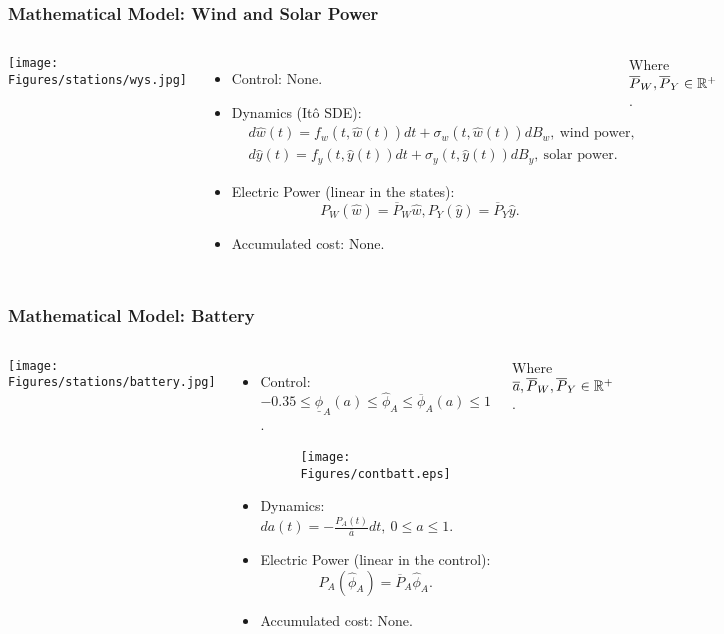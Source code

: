 \begin{frame}
\frametitle{Mathematical Model: Wind and Solar Power}

\begin{columns}[c]

\texttt{[image: Figures/stations/wys.jpg]}\\

\begin{itemize}
\item Control: None.
\item Dynamics (It\^o SDE):
\begin{equation*}
\begin{aligned}
&d\hat{w}(t)=f_w(t,\hat{w}(t))dt+\sigma_w(t,\hat{w}(t))dB_w,\ \text{wind power},\\
&d\hat{y}(t)=f_y(t,\hat{y}(t))dt+\sigma_y(t,\hat{y}(t))dB_y,\ \text{solar power}.
\end{aligned}
\end{equation*}
\item Electric Power (linear in the states):
\begin{equation*}
P_W(\hat{w})=\overline{P}_W\hat{w},P_Y(\hat{y})=\overline{P}_Y\hat{y}.
\end{equation*}
\item Accumulated cost: None.
\end{itemize}
Where $\overline{P}_W,\overline{P}_Y\in\mathbb{R}^+$.
\end{columns}
\end{frame}


\begin{frame}
\frametitle{Mathematical Model: Battery}

\begin{columns}[c]

\texttt{[image: Figures/stations/battery.jpg]}\\

\begin{itemize}
\item Control: $-0.35\leq\underline{\phi}_A(a)\leq\hat{\phi}_A\leq\overline{\phi}_A(a)\leq1$.
\begin{figure}[ht!]
\centering
\texttt{[image: Figures/contbatt.eps]}
\end{figure}
\item Dynamics: $da(t)=-\frac{P_A(t)}{\overline{a}}dt,\ 0\leq a\leq1$.
\item Electric Power (linear in the control):
\begin{equation*}
P_A\left(\hat{\phi}_A\right)=\overline{P}_A\hat{\phi}_A.
\end{equation*}
\item Accumulated cost: None.
\end{itemize}
Where $\overline{a},\overline{P}_W,\overline{P}_Y\in\mathbb{R}^+$.

\end{columns}
\end{frame}

